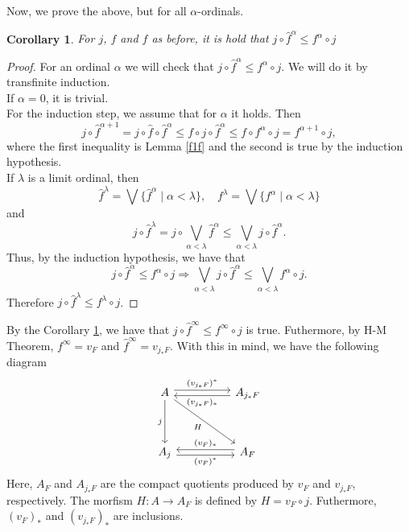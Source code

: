 \documentclass[11pt]{amsart}
\theoremstyle{plain}
\newtheorem{cor}[thm]{Corollary}
\theoremstyle{definition}
\begin{document}
Now, we prove the above, but for all $\alpha$-ordinals.\\

\begin{cor}\label{finftyf}
    For $j$, $f$ and $\hat{f}$ as before, it is hold that $j\circ \hat{f}^\alpha\leq f^\alpha\circ j$
\end{cor}

\begin{proof}
    For an ordinal $\alpha$ we will check that $j\circ \hat{f}^\alpha\leq f^\alpha\circ j$. We will do it by transfinite induction.\\

    If $\alpha=0$, it is trivial.\\

    For the induction step, we assume that for $\alpha$ it holds. Then
    \[
    j\circ \hat{f}^{\alpha+1}=j\circ \hat{f}\circ \hat{f}^{\alpha}\leq  f\circ j\circ \hat{f}^\alpha\leq f\circ f^\alpha\circ j=f^{\alpha+1}\circ j,
    \]
    where the first inequality is Lemma \ref{f1f} and the second is true by the induction hypothesis.\\

    If $\lambda$ is a limit ordinal, then
	\[
	\hat{f}^\lambda=\bigvee\{\hat{f}^\alpha\mid \alpha<\lambda\}, \quad f^\lambda=\bigvee\{f^\alpha\mid \alpha<\lambda\} 
	\]
	and 
	\[
		j\circ \hat{f}^\lambda=j\circ \bigvee_{\alpha<\lambda}\hat{f}^\alpha\leq\bigvee_{\alpha<\lambda}j\circ \hat{f}^\alpha.
	\]
	Thus, by the induction hypothesis, we have that
	\[
	j\circ \hat{f}^\alpha\leq f^\alpha\circ j\Rightarrow \bigvee_{\alpha<\lambda}j\circ \hat{f}^\alpha\leq \bigvee_{\alpha<\lambda} f^\alpha\circ j.
	\]
	Therefore $j\circ \hat{f}^\lambda\leq f^\lambda\circ j$.
\end{proof}

By the Corollary \ref{finftyf}, we have that $j\circ \hat{f}^\infty\leq f^\infty\circ j$ is true. Futhermore, by H-M Theorem, $f^\infty=v_F$ and $\hat{f}^\infty=v_{j_*F}$. With this in mind, we have the following diagram
\[\begin{tikzcd}
	A && {A_{j_*F}} \\
	\\
	{A_j} && {A_F}
	\arrow["{(v_{j_*F})^*}", shift left, from=1-1, to=1-3]
	\arrow["j"', from=1-1, to=3-1]
	\arrow["H"', from=1-1, to=3-3]
	\arrow["{(v_{j_*F})_*}", shift left, from=1-3, to=1-1]
	\arrow["{(v_F)^*}"', shift right, from=3-1, to=3-3]
	\arrow["{(v_F)_*}"', shift right, from=3-3, to=3-1]
\end{tikzcd}\]
Here, $A_F$ and $A_{j_*F}$ are the compact quotients produced by $v_F$ and $v_{j_*F}$, respectively. The morfism $H\colon A\to A_F$ is defined by $H=v_F\circ j$. Futhermore, $(v_F)_*$ and $(v_{j_*F})_*$ are inclusions.\\
\end{document}
